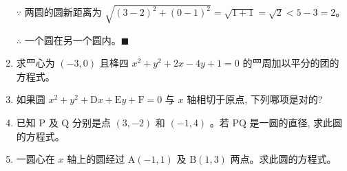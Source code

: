 \documentclass[10pt]{article}
\begin{document}
\begin{enumerate}[leftmargin=*]
  $\because$ 两圆的圆新距离为 $\sqrt{(3-2)^{2}+(0-1)^{2}} = \sqrt{1+1} = \sqrt{2} < 5-3 = 2$。

  $\therefore$ 一个圆在另一个圆内。\hfill$\blacksquare$
  
  \item 求罒心为 $(-3,0)$ 且栙四 $x^{2}+y^{2}+2 x-4 y+1=0$ 的罒周加以平分的团的方程式。
  \item 如果圆 $x^{2}+y^{2}+\mathrm{D} x+\mathrm{E} y+\mathrm{F}=0$ 与 $x$ 轴相切于原点, 下列哪项是对的?
  \item 已知 $\mathrm{P}$ 及 $\mathrm{Q}$ 分别是点 $(3,-2)$ 和 $(-1,4)$ 。若 $\mathrm{PQ}$ 是一圆的直径, 求此圆的方程式。
  \item 一圆心在 $x$ 轴上的圆经过 $\mathrm{A}(-1,1)$ 及 $\mathrm{B}(1,3)$ 两点。求此圆的方程式。
\end{enumerate}









\end{document}
